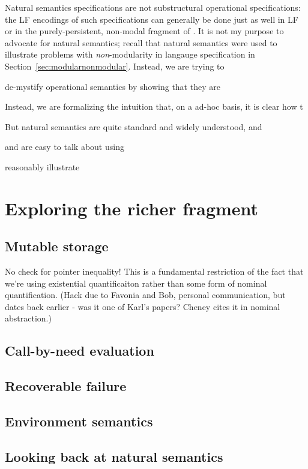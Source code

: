 Natural semantics specifications are not substructural operational
specifications: the LF encodings of such specifications can generally
be done just as well in LF or in the purely-persistent, non-modal
fragment of \sls. It is not my purpose to advocate for natural
semantics; recall that natural semantics were used to illustrate
problems with {\it non}-modularity in langauge specification in
Section~\ref{sec:modularnonmodular}. Instead, we are trying to


de-mystify operational semantics by showing that they are 

Instead, we are formalizing the
intuition that, on a ad-hoc basis, it is clear how t 

But natural semantics are
quite standard and widely understood, and 


 and are easy to talk about
using 

reasonably illustrate


\section{Exploring the richer fragment}
\label{sec:richer-ordered-abstract}

\subsection{Mutable storage}
\label{sec:mutable-storage}

No check for pointer inequality! This is a fundamental restriction of
the fact that we're using existential quantificaiton rather than some
form of nominal quantification. (Hack due to Favonia and Bob, personal
communication, but dates back earlier - was it one of Karl's papers?
Cheney cites it in nominal abstraction.)

\subsection{Call-by-need evaluation}

\subsection{Recoverable failure}

\subsection{Environment semantics}

\subsection{Looking back at natural semantics}
\label{sec:enriching-natsem}

